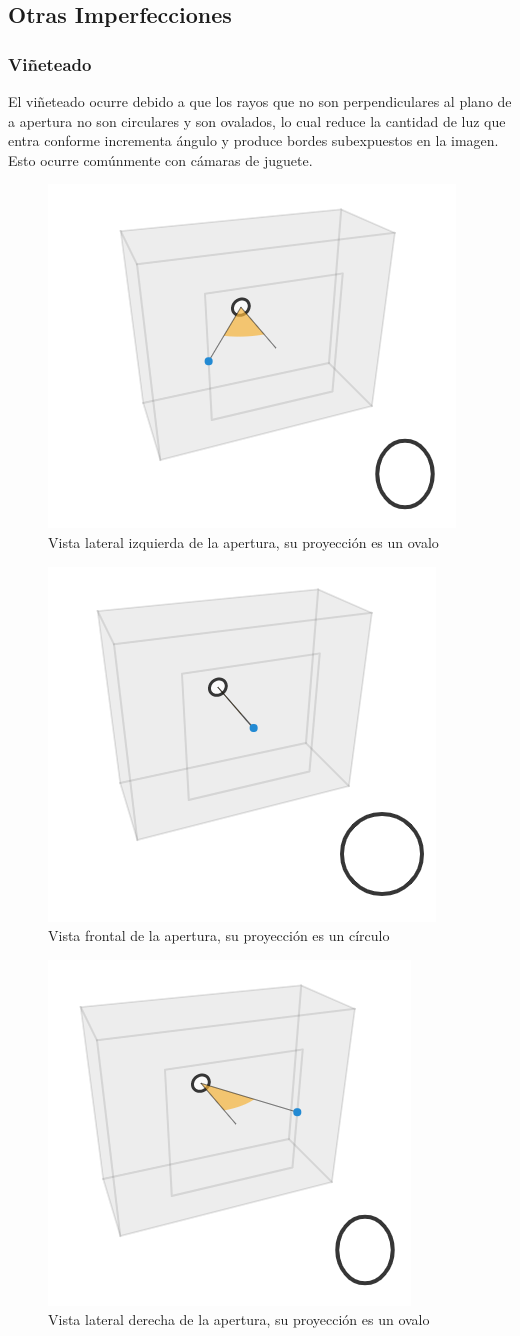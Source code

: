 \documentclass{article}
\begin{document}
\subsection{Otras Imperfecciones}

\subsubsection{Viñeteado}

El viñeteado ocurre debido a que los rayos que no son perpendiculares al plano de a apertura no son circulares y son ovalados, lo cual reduce la cantidad de luz que entra conforme incrementa ángulo y produce bordes subexpuestos en la imagen. Esto ocurre comúnmente con cámaras de juguete.

\begin{figure}[H]
	\centering
	\includegraphics[width=0.45\linewidth]{Figuras/Vignetting_lzquierdo}
	\caption{Vista lateral izquierda de la apertura, su proyección es un ovalo}
	\label{fig:vignettinglzquierdo}
\end{figure}

\begin{figure}[H]
	\centering
	\includegraphics[width=0.35\linewidth]{Figuras/Vignetting_Medio}
	\caption{Vista frontal de la apertura, su proyección es un círculo}
	\label{fig:vignettingmedio}
\end{figure}

\begin{figure}[H]
	\centering
	\includegraphics[width=0.35\linewidth]{Figuras/Vignetting_Derecho}
	\caption{Vista lateral derecha de la apertura, su proyección es un ovalo}
	\label{fig:vignettingderecho}
\end{figure}
\end{document}
